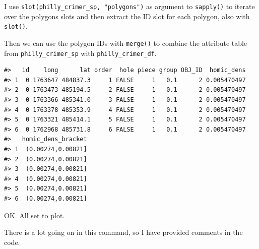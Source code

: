\documentclass[]{book}
\newenvironment{Shaded}{\begin{snugshade}}{\end{snugshade}}
\newcommand{\KeywordTok}[1]{\textcolor[rgb]{0.13,0.29,0.53}{\textbf{#1}}}
\newcommand{\DataTypeTok}[1]{\textcolor[rgb]{0.13,0.29,0.53}{#1}}
\newcommand{\StringTok}[1]{\textcolor[rgb]{0.31,0.60,0.02}{#1}}
\newcommand{\ControlFlowTok}[1]{\textcolor[rgb]{0.13,0.29,0.53}{\textbf{#1}}}
\newcommand{\OperatorTok}[1]{\textcolor[rgb]{0.81,0.36,0.00}{\textbf{#1}}}
\newcommand{\NormalTok}[1]{#1}
\theoremstyle{definition}
\theoremstyle{definition}
\theoremstyle{definition}
\theoremstyle{remark}
\begin{document}
I use \texttt{slot(philly\_crimer\_sp,\ "polygons")} as argument to
\texttt{sapply()} to iterate over the polygons slots and then extract
the ID slot for each polygon, also with \texttt{slot()}.

Then we can use the polygon IDs with \texttt{merge()} to combine the
attribute table from \texttt{philly\_crimer\_sp} with
\texttt{philly\_crimer\_df}.

\begin{Shaded}
\end{Shaded}

\begin{verbatim}
#>   id    long      lat order  hole piece group OBJ_ID  homic_dens
#> 1  0 1763647 484837.3     1 FALSE     1   0.1      2 0.005470497
#> 2  0 1763473 485194.5     2 FALSE     1   0.1      2 0.005470497
#> 3  0 1763366 485341.0     3 FALSE     1   0.1      2 0.005470497
#> 4  0 1763378 485353.9     4 FALSE     1   0.1      2 0.005470497
#> 5  0 1763321 485414.1     5 FALSE     1   0.1      2 0.005470497
#> 6  0 1762968 485731.8     6 FALSE     1   0.1      2 0.005470497
#>   homic_dens_bracket
#> 1  (0.00274,0.00821]
#> 2  (0.00274,0.00821]
#> 3  (0.00274,0.00821]
#> 4  (0.00274,0.00821]
#> 5  (0.00274,0.00821]
#> 6  (0.00274,0.00821]
\end{verbatim}

OK. All set to plot.

There is a lot going on in this command, so I have provided comments in
the code.
\end{document}
